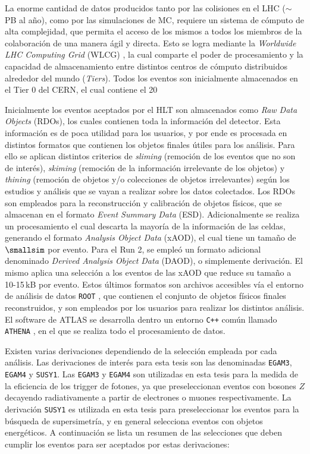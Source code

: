 La enorme cantidad de datos producidos tanto por las colisiones en el LHC ($\sim$\,PB al año), como por las simulaciones de MC, requiere un sistema de cómputo de alta complejidad, que permita el acceso de los mismos a todos los miembros de la colaboración de una manera ágil y directa. Esto se logra mediante la \textit{Worldwide LHC Computing Grid} (WLCG) \cite{grid}, la cual comparte el poder de procesamiento y la capacidad de almacenamiento entre distintos centros de cómputo distribuidos alrededor del mundo (\textit{Tiers}). Todos los eventos son inicialmente almacenados en el Tier 0 del CERN, el cual contiene el 20

Inicialmente los eventos aceptados por el HLT son almacenados como \textit{Raw Data Objects} (RDOs), los cuales contienen toda la información del detector. Esta información es de poca utilidad para los usuarios, y por ende es procesada en distintos formatos que contienen los objetos finales útiles para los análisis. Para ello se aplican distintos criterios de \textit{sliming} (remoción de los eventos que no son de interés), \textit{skiming} (remoción de la información irrelevante de los objetos) y \textit{thining} (remoción de objetos y/o colecciones de objetos irrelevantes) según los estudios y análisis que se vayan a realizar sobre los datos colectados. Los RDOs son empleados para la reconstrucción y calibración de objetos físicos, que se almacenan en el formato \textit{Event Summary Data} (ESD). Adicionalmente se realiza un procesamiento el cual descarta la mayoría de la información de las celdas, generando el formato \textit{Analysis Object Data} (xAOD), el cual tiene un tamaño de {$\smallsim$} por evento. Para el Run 2, se empleó un formato adicional denominado \textit{Derived Analysis Object Data} (DAOD), o simplemente derivación. El mismo aplica una selección a los eventos de las xAOD que reduce su tamaño a 10-15\,kB por evento. Estos últimos formatos son archivos accesibles vía el entorno de análisis de datos \texttt{ROOT} \cite{Brun:1997}, que contienen el conjunto de objetos físicos finales reconstruidos, y son empleados por los usuarios para realizar los distintos análisis.
El software de ATLAS se desarrolla dentro un entorno \texttt{C++} común llamado \texttt{ATHENA} \cite{ATLAS-TDR-17, analysistools, Calafiura:865624}, en el que se realiza todo el procesamiento de datos. 

Existen varias derivaciones dependiendo de la selección empleada por cada análisis. Las derivaciones de interés para esta tesis son las denominadas \texttt{EGAM3}, \texttt{EGAM4} y \texttt{SUSY1}. Las \texttt{EGAM3} y \texttt{EGAM4} son utilizadas en esta tesis para la medida de la eficiencia de los trigger de fotones, ya que preseleccionan eventos con bosones $Z$ decayendo radiativamente a partir de electrones o muones respectivamente. La derivación \texttt{SUSY1} es utilizada en esta tesis para preseleccionar los eventos para la búsqueda de supersimetría, y en general selecciona eventos con objetos energéticos. A continuación se lista un resumen de las selecciones que deben cumplir los eventos para ser aceptados por estas derivaciones:




